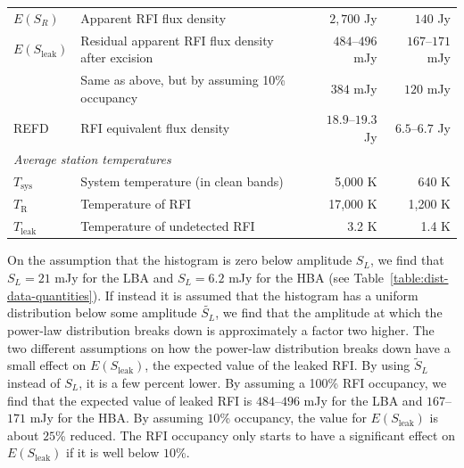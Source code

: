 \documentclass[useAMS,usenatbib]{mn2e}
\begin{document}
\begin{table}
\begin{minipage}{12cm}
\begin{tabular}{@{}llrr@{}}
$E(S_R)$ & Apparent RFI flux density & $2,700$ Jy & $140$ Jy \\
$E(S_\textrm{leak})$& Residual apparent RFI flux density after excision & $484$--$496$ mJy & $167$--$171$ mJy \\
 & Same as above, but by assuming 10\% occupancy & $384$ mJy & $120$ mJy \\ %
REFD& RFI equivalent flux density & $18.9$--$19.3$ Jy & $6.5$--$6.7$ Jy \\
\hline
\multicolumn{4}{l}{\textit{Average station temperatures}} \\
\hline
$T_\textrm{sys}$ & System temperature (in clean bands)  & 5,000 K & 640 K \\
$T_\textrm{R}$ & Temperature of RFI & 17,000 K & 1,200 K \\
$T_\textrm{leak}$ & Temperature of undetected RFI & 3.2 K & 1.4 K \\
\hline
\hline
\end{tabular}
\end{minipage}
\end{table}

On the assumption that the histogram is zero below amplitude $S_L$, we find that $S_L=21$ mJy for the LBA and $S_L=6.2$ mJy for the HBA (see Table~\ref{table:dist-data-quantities}). If instead it is assumed that the histogram has a uniform distribution below some amplitude $\tilde{S_L}$, we find that the amplitude at which the power-law distribution breaks down is approximately a factor two higher. The two different assumptions on how the power-law distribution breaks down have a small effect on $E(S_\textrm{leak})$, the expected value of the leaked RFI. By using $\tilde{S}_L$ instead of $S_L$, it is a few percent lower. By assuming a 100\% RFI occupancy, we find that the expected value of leaked RFI is $484$--$496$ mJy for the LBA and $167$--$171$ mJy for the HBA. By assuming $10$\% occupancy, the value for $E(S_\textrm{leak})$ is about $25$\% reduced. The RFI occupancy only starts to have a significant effect on $E(S_\textrm{leak})$ if it is well below $10$\%. 
\end{document}

